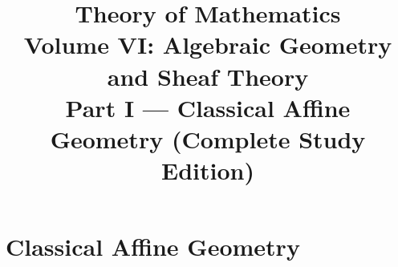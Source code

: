 \documentclass[11pt,a4paper,oneside,openany]{book}
\title{Theory of Mathematics\\[0.5em]\Large Volume VI: Algebraic Geometry and Sheaf Theory\\[0.4em]\normalsize Part I --- Classical Affine Geometry (Complete Study Edition)}
\author{}\date{}
\begin{document}
\maketitle\clearpage
\frontmatter\tableofcontents
\mainmatter
\part{Classical Affine Geometry}





\end{document}

